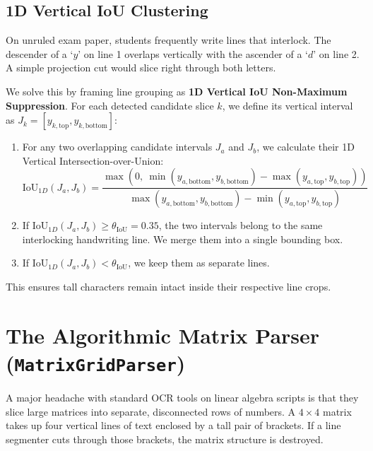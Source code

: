 \subsection{1D Vertical IoU Clustering}
On unruled exam paper, students frequently write lines that interlock. The descender of a `$y$' on line 1 overlaps vertically with the ascender of a `$d$' on line 2. A simple projection cut would slice right through both letters.

We solve this by framing line grouping as \textbf{1D Vertical IoU Non-Maximum Suppression}. For each detected candidate slice $k$, we define its vertical interval as $J_k = [y_{k, \text{top}}, y_{k, \text{bottom}}]$:
\begin{enumerate}
    \item For any two overlapping candidate intervals $J_a$ and $J_b$, we calculate their 1D Vertical Intersection-over-Union:
    \begin{equation}
    \text{IoU}_{1D}(J_a, J_b) = \frac{\max\left(0, \ \min(y_{a, \text{bottom}}, y_{b, \text{bottom}}) - \max(y_{a, \text{top}}, y_{b, \text{top}})\right)}{\max(y_{a, \text{bottom}}, y_{b, \text{bottom}}) - \min(y_{a, \text{top}}, y_{b, \text{top}})}
    \end{equation}
    \item If $\text{IoU}_{1D}(J_a, J_b) \ge \theta_{\text{IoU}} = 0.35$, the two intervals belong to the same interlocking handwriting line. We merge them into a single bounding box.
    \item If $\text{IoU}_{1D}(J_a, J_b) < \theta_{\text{IoU}}$, we keep them as separate lines.
\end{enumerate}
This ensures tall characters remain intact inside their respective line crops.

\section{The Algorithmic Matrix Parser (\texttt{MatrixGridParser})}
\label{sec:matrix_grid_parser}

A major headache with standard OCR tools on linear algebra scripts is that they slice large matrices into separate, disconnected rows of numbers. A $4 \times 4$ matrix takes up four vertical lines of text enclosed by a tall pair of brackets. If a line segmenter cuts through those brackets, the matrix structure is destroyed.

